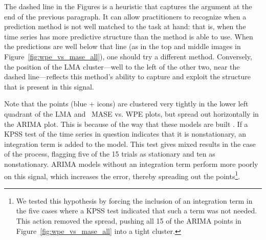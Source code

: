 The dashed line in the Figures is a heuristic that captures the
argument at the end of the previous paragraph.  It can allow
practitioners to recognize when a prediction method is not well
matched to the task at hand: that is, when the time series has more
predictive structure than the method is able to use.  When the
predictions are well below that line (as in the top and middle images
in Figure~\ref{fig:wpe_vs_mase_all}), one should try a different
method.  Conversely, the position of the LMA cluster---well to the
left of the other two, near the dashed line---reflects this method's
ability to capture and exploit the structure that is present in this
signal.

Note that the \col points (blue {\color{blue}$+$} icons) are clustered
very tightly in the lower left quadrant of the LMA and \naive ~MASE
vs. WPE plots, but spread out horizontally in the ARIMA plot.  This is
because of the way that these models are built \cite{autoARIMA}.  If
a KPSS test of the time series in question indicates that it is
nonstationary, an integration term is added to the model.  This test
gives mixed results in the case of the \col process, flagging five of
the 15 trials as stationary and ten as nonstationary.  ARIMA models
without an integration term perform more poorly on this signal, which
increases the error, thereby spreading out the points\footnote{We
  tested this hypothesis by forcing the inclusion of an integration
  term in the five cases where a KPSS test indicated that such a term
  was not needed.  This action removed the spread, pushing all 15 of
  the \col ARIMA points in Figure~\ref{fig:wpe_vs_mase_all} into a
  tight cluster.}.

